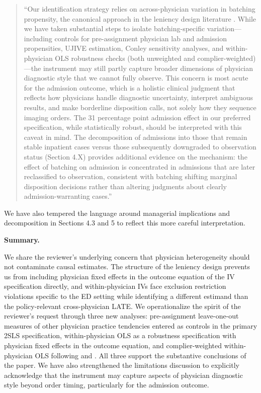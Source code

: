 \documentclass[11pt]{article}
\newcommand{\1}{\hbox{\rm 1\kern-.35em 1}}
\begin{document}
\begin{quote}
``Our identification strategy relies on across-physician variation in batching propensity, the canonical approach in the leniency design literature \citep{chyn2025examiner}. While we have taken substantial steps to isolate batching-specific variation---including controls for pre-assignment physician lab and admission propensities, UJIVE estimation, Conley sensitivity analyses, and within-physician OLS robustness checks (both unweighted and complier-weighted)---the instrument may still partly capture broader dimensions of physician diagnostic style that we cannot fully observe. This concern is most acute for the admission outcome, which is a holistic clinical judgment that reflects how physicians handle diagnostic uncertainty, interpret ambiguous results, and make borderline disposition calls, not solely how they sequence imaging orders. The 31 percentage point admission effect in our preferred specification, while statistically robust, should be interpreted with this caveat in mind. The decomposition of admissions into those that remain stable inpatient cases versus those subsequently downgraded to observation status (Section 4.X) provides additional evidence on the mechanism: the effect of batching on admission is concentrated in admissions that are later reclassified to observation, consistent with batching shifting marginal disposition decisions rather than altering judgments about clearly admission-warranting cases.''
\end{quote}

We have also tempered the language around managerial implications and decomposition in Sections 4.3 and 5 to reflect this more careful interpretation.

\textbf{Summary.}

We share the reviewer's underlying concern that physician heterogeneity should not contaminate causal estimates. The structure of the leniency design prevents us from including physician fixed effects in the outcome equation of the IV specification directly, and within-physician IVs face exclusion restriction violations specific to the ED setting while identifying a different estimand than the policy-relevant cross-physician LATE. We operationalize the spirit of the reviewer's request through three new analyses: pre-assignment leave-one-out measures of other physician practice tendencies entered as controls in the primary 2SLS specification, within-physician OLS as a robustness specification with physician fixed effects in the outcome equation, and complier-weighted within-physician OLS following \citet{bhuller2020incarceration} and \citet{dobbie2018effects}. All three support the substantive conclusions of the paper. We have also strengthened the limitations discussion to explicitly acknowledge that the instrument may capture aspects of physician diagnostic style beyond order timing, particularly for the admission outcome.
\end{document}
